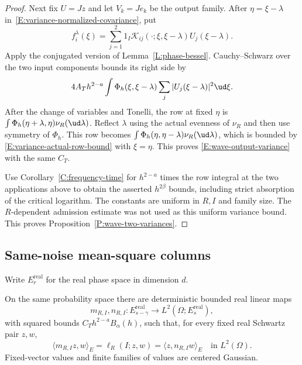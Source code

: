 \begin{proof}
  Next fix $U = Jz$ and let $V_k = Je_k$ be the output family. After
  $\eta = \xi-\lambda$ in~\eqref{E:variance-normalized-covariance}, put
  \[
    f_i^\lambda(\xi) = \sum_{j=1}^2
    1_I\mathcal K_{ij}(\cdot;\xi,\xi-\lambda)U_j(\xi-\lambda).
  \]
  Apply the conjugated version of Lemma~\ref{L:phase-bessel}.
  Cauchy--Schwarz over the two input components bounds its right side by
  \[
    4A_T h^{2-a}\int\Phi_h(\xi,\xi-\lambda)
    \sum_j|U_j(\xi-\lambda)|^2\ud\xi.
  \]
  After the change of variables and Tonelli, the row at fixed $\eta$ is
  $\int\Phi_h(\eta+\lambda,\eta)\nu_R(\ud\lambda)$. Reflect $\lambda$
  using the actual evenness of $\nu_R$ and then use symmetry of $\Phi_h$.
  This row becomes
  $\int\Phi_h(\eta,\eta-\lambda)\nu_R(\ud\lambda)$, which is bounded by
  \eqref{E:variance-actual-row-bound} with $\xi = \eta$. This proves
  \eqref{E:wave-output-variance} with the same $C_T$.

  Use Corollary~\ref{C:frequency-time} for $h^{2-a}$ times the row integral
  at the two applications above to obtain the asserted $h^{2\beta}$ bounds,
  including strict absorption of the critical logarithm. The
  constants are uniform in $R,I$ and family size. The $R$-dependent
  admission estimate was not used as this uniform variance bound.
  This proves Proposition~\ref{P:wave-two-variances}.
\end{proof}

\subsection{Same-noise mean-square columns}

Write $E_r^{\mathrm{real}}$ for the real phase space in dimension $d$.

\begin{proposition}\label{P:wave-square-columns}
  On the same probability space there are deterministic bounded real
  linear maps
  \[
    m_{R,I},n_{R,I}:E_{s-\gamma}^{\mathrm{real}}\longrightarrow
    L^2(\Omega;E_s^{\mathrm{real}}),
  \]
  with squared bounds $C_T h^{2-a}B_\alpha(h)$, such that, for every
  fixed real Schwartz pair $z,w$,
  \begin{equation}\label{E:variance-square-columns}
    \langle m_{R,I}z,w\rangle_E
    = \ell_R(I;z,w) = \langle z,n_{R,I}w\rangle_E
    \quad\text{in }L^2(\Omega).
  \end{equation}
  Fixed-vector values and finite families of values are centered Gaussian.
\end{proposition}

